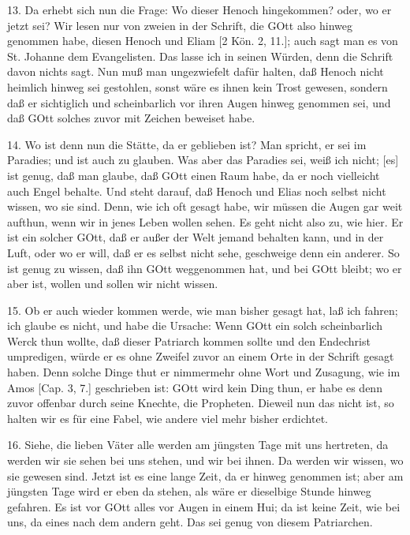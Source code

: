 13. Da erhebt sich nun die Frage: Wo dieser Henoch hingekommen? oder, wo er jetzt sei? Wir lesen nur von zweien in der Schrift, die GOtt also hinweg genommen habe, diesen Henoch und Eliam [2 Kön. 2, 11.]; auch sagt man es von St. Johanne dem Evangelisten. Das lasse ich in seinen Würden, denn die Schrift davon nichts sagt. Nun muß man ungezwiefelt dafür halten, daß Henoch nicht heimlich hinweg sei gestohlen, sonst wäre es ihnen kein Trost gewesen, sondern daß er sichtiglich und scheinbarlich vor ihren Augen hinweg genommen sei, und daß GOtt solches zuvor mit Zeichen beweiset habe.

14. Wo ist denn nun die Stätte, da er geblieben ist? Man spricht, er sei im Paradies; und ist auch zu glauben. Was aber das Paradies sei, weiß ich nicht; [es] ist genug, daß man glaube, daß GOtt einen Raum habe, da er noch vielleicht auch Engel behalte. Und steht darauf, daß Henoch und Elias noch selbst nicht wissen, wo sie sind. Denn, wie ich oft gesagt habe, wir müssen die Augen gar weit aufthun, wenn wir in jenes Leben wollen sehen. Es geht nicht
also zu, wie hier. Er ist ein solcher GOtt, daß er außer der Welt jemand behalten kann, und in der Luft, oder wo er will, daß er es selbst nicht sehe, geschweige denn ein anderer. So ist genug zu wissen, daß ihn GOtt weggenommen hat, und bei GOtt bleibt; wo er aber ist, wollen und sollen wir nicht wissen.

15. Ob er auch wieder kommen werde, wie man bisher gesagt hat, laß ich fahren; ich glaube es nicht, und habe die Ursache: Wenn GOtt ein solch scheinbarlich Werck thun wollte, daß dieser Patriarch kommen sollte und den Endechrist umpredigen, würde er es ohne Zweifel zuvor an einem Orte in der Schrift gesagt haben. Denn solche Dinge thut er nimmermehr ohne Wort und Zusagung, wie im Amos [Cap. 3, 7.] geschrieben ist: GOtt wird kein Ding thun, er habe es denn zuvor offenbar durch seine Knechte, die Propheten. Dieweil nun das nicht ist, so halten wir es für eine Fabel, wie andere viel mehr bisher erdichtet.

16. Siehe, die lieben Väter alle werden am jüngsten Tage mit uns hertreten, da werden wir sie sehen bei uns stehen, und wir bei ihnen. Da werden wir wissen, wo sie gewesen sind. Jetzt ist es eine lange Zeit, da er hinweg genommen ist; aber am jüngsten Tage wird er eben da stehen, als wäre er dieselbige Stunde hinweg gefahren. Es ist vor GOtt alles vor Augen in einem Hui; da ist keine Zeit, wie bei uns, da eines nach dem andern geht. Das sei genug von diesem Patriarchen.

